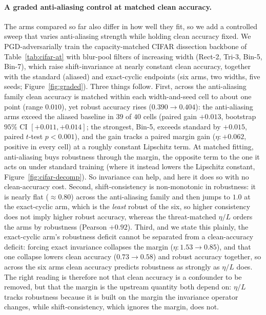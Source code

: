 \documentclass{article}
\theoremstyle{definition}
\begin{document}
\paragraph{A graded anti-aliasing control at matched clean accuracy.} The arms compared so far also differ in how well they fit, so we add a controlled sweep that varies anti-aliasing strength while holding clean accuracy fixed. We PGD-adversarially train the capacity-matched CIFAR dissection backbone of Table~\ref{tab:cifar-at} with blur-pool filters of increasing width (Rect-2, Tri-3, Bin-5, Bin-7), which raise shift-invariance at nearly constant clean accuracy, together with the standard (aliased) and exact-cyclic endpoints (six arms, two widths, five seeds; Figure~\ref{fig:graded}). Three things follow. First, across the anti-aliasing family clean accuracy is matched within each width-and-seed cell to about one point (range $0.010$), yet robust accuracy rises ($0.390\to0.404$): the anti-aliasing arms exceed the aliased baseline in $39$ of $40$ cells (paired gain $+0.013$, bootstrap $95\%$ CI $[+0.011,+0.014]$; the strongest, Bin-5, exceeds standard by $+0.015$, paired $t$-test $p<0.001$), and the gain tracks a paired margin gain ($\eta:+0.062$, positive in every cell) at a roughly constant Lipschitz term. At matched fitting, anti-aliasing buys robustness through the margin, the opposite term to the one it acts on under standard training (where it instead lowers the Lipschitz constant, Figure~\ref{fig:cifar-decomp}). So invariance can help, and here it does so with no clean-accuracy cost. Second, shift-consistency is non-monotonic in robustness: it is nearly flat ($\approx0.80$) across the anti-aliasing family and then jumps to $1.0$ at the exact-cyclic arm, which is the \emph{least} robust of the six, so higher consistency does not imply higher robust accuracy, whereas the threat-matched $\eta/L$ orders the arms by robustness (Pearson $+0.92$). Third, and we state this plainly, the exact-cyclic arm's robustness deficit cannot be separated from a clean-accuracy deficit: forcing exact invariance collapses the margin ($\eta:1.53\to0.85$), and that one collapse lowers clean accuracy ($0.73\to0.58$) and robust accuracy together, so across the six arms clean accuracy predicts robustness as strongly as $\eta/L$ does. The right reading is therefore not that clean accuracy is a confounder to be removed, but that the margin is the upstream quantity both depend on: $\eta/L$ tracks robustness because it is built on the margin the invariance operator changes, while shift-consistency, which ignores the margin, does not.
\end{document}
